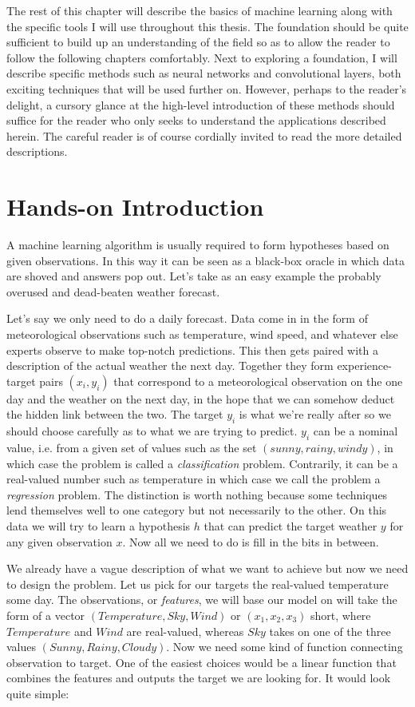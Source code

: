 The rest of this chapter will describe the basics of machine learning
along with the specific tools I will use throughout this thesis.
The foundation should be quite sufficient to build up
an understanding of the field
so as to allow the reader to follow the following chapters comfortably.
Next to exploring a foundation,
I will describe specific methods such as neural networks
and convolutional layers,
both exciting techniques that will be used further on.
However, perhaps to the reader's delight,
a cursory glance at the high-level introduction of these methods
should suffice for the reader who only seeks to understand
the applications described herein.
The careful reader is of course cordially invited
to read the more detailed descriptions.


\section{Hands-on Introduction}
A machine learning algorithm
is usually required to form hypotheses
based on given observations.
In this way it can be seen as
a black-box oracle
in which data are shoved
and answers pop out.
Let's take as an easy example
the probably overused and dead-beaten weather forecast.

Let's say we only need to do a daily forecast.
Data come in in the form of meteorological observations
such as temperature, wind speed, and whatever else
experts observe to make top-notch predictions.
This then gets paired
with a description of the actual weather the next day.
Together they form experience-target pairs
$(x_i, y_i)$
that correspond to a meteorological observation
on the one day and the weather on the next day,
in the hope that we can somehow deduct the hidden
link between the two.
The target $y_i$ is what we're really after
so we should choose carefully as to what we are trying to predict.
$y_i$ can be a nominal value,
i.e. from a given set of values
such as the set $(sunny, rainy, windy)$,
in which case the problem is called a \textit{classification} problem.
Contrarily, it can be a real-valued number such as temperature
in which case we call the problem a \textit{regression} problem.
The distinction is worth nothing because
some techniques lend themselves well to
one category but not necessarily to the other.
On this data we will try to learn a hypothesis $h$
that can predict the target weather $y$
for any given observation $x$.
Now all we need to do is fill in the bits in between.

We already have a vague description of what we want to achieve
but now we need to design the problem.
Let us pick for our targets the real-valued temperature some day.
The observations, or \textit{features}, we will base our model on
will take the form of a vector
$(Temperature, Sky, Wind)$ or $(x_1, x_2, x_3)$ short,
where $Temperature$ and $Wind$ are real-valued,
whereas $Sky$ takes on one of the three values
$(Sunny, Rainy, Cloudy)$.
Now we need some kind of function connecting
observation to target.
One of the easiest choices would be a linear
function that combines the features
and outputs the target we are looking for.
It would look quite simple:


